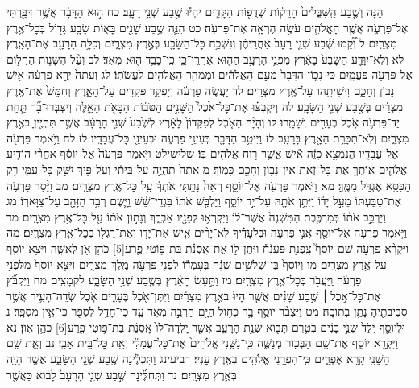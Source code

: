 \documentclass[twoside, openany, parskip=half, 11pt]{book}
\begin{document}
הֵ֔נָּה וְשֶׁ֤בַע הַֽשִּׁבֳּלִים֙ הָרֵק֔וֹת שְׁדֻפ֖וֹת הַקָּדִ֑ים יִהְי֕וּ שֶׁ֖בַע שְׁנֵ֥י רָעָֽב׃ כח ה֣וּא הַדָּבָ֔ר אֲשֶׁ֥ר דִּבַּ֖רְתִּי אֶל־פַּרְעֹ֑ה אֲשֶׁ֧ר הָאֱלֹהִ֛ים עֹשֶׂ֖ה הֶרְאָ֥ה אֶת־פַּרְעֹֽה׃ כט הִנֵּ֛ה שֶׁ֥בַע שָׁנִ֖ים בָּא֑וֹת שָׂבָ֥ע גָּד֖וֹל בְּכׇל־אֶ֥רֶץ מִצְרָֽיִם׃ ל וְ֠קָ֠מוּ שֶׁ֜בַע שְׁנֵ֤י רָעָב֙ אַחֲרֵיהֶ֔ן וְנִשְׁכַּ֥ח כׇּל־הַשָּׂבָ֖ע בְּאֶ֣רֶץ מִצְרָ֑יִם וְכִלָּ֥ה הָרָעָ֖ב אֶת־הָאָֽרֶץ׃ לא וְלֹֽא־יִוָּדַ֤ע הַשָּׂבָע֙ בָּאָ֔רֶץ מִפְּנֵ֛י הָרָעָ֥ב הַה֖וּא אַחֲרֵי־כֵ֑ן כִּֽי־כָבֵ֥ד ה֖וּא מְאֹֽד׃ לב וְעַ֨ל הִשָּׁנ֧וֹת הַחֲל֛וֹם אֶל־פַּרְעֹ֖ה פַּעֲמָ֑יִם כִּֽי־נָכ֤וֹן הַדָּבָר֙ מֵעִ֣ם הָאֱלֹהִ֔ים וּמְמַהֵ֥ר הָאֱלֹהִ֖ים לַעֲשֹׂתֽוֹ׃ לג וְעַתָּה֙ יֵרֶ֣א פַרְעֹ֔ה אִ֖ישׁ נָב֣וֹן וְחָכָ֑ם וִישִׁיתֵ֖הוּ עַל־אֶ֥רֶץ מִצְרָֽיִם׃ לד יַעֲשֶׂ֣ה פַרְעֹ֔ה וְיַפְקֵ֥ד פְּקִדִ֖ים עַל־הָאָ֑רֶץ וְחִמֵּשׁ֙ אֶת־אֶ֣רֶץ מִצְרַ֔יִם בְּשֶׁ֖בַע שְׁנֵ֥י הַשָּׂבָֽע׃ לה וְיִקְבְּצ֗וּ אֶת־כׇּל־אֹ֙כֶל֙ הַשָּׁנִ֣ים הַטֹּב֔וֹת הַבָּאֹ֖ת הָאֵ֑לֶּה וְיִצְבְּרוּ־בָ֞ר תַּ֧חַת יַד־פַּרְעֹ֛ה אֹ֥כֶל בֶּעָרִ֖ים וְשָׁמָֽרוּ׃ לו וְהָיָ֨ה הָאֹ֤כֶל לְפִקָּדוֹן֙ לָאָ֔רֶץ לְשֶׁ֙בַע֙ שְׁנֵ֣י הָרָעָ֔ב אֲשֶׁ֥ר תִּהְיֶ֖יןָ בְּאֶ֣רֶץ מִצְרָ֑יִם וְלֹֽא־תִכָּרֵ֥ת הָאָ֖רֶץ בָּרָעָֽב׃ לז וַיִּיטַ֥ב הַדָּבָ֖ר בְּעֵינֵ֣י פַרְעֹ֑ה וּבְעֵינֵ֖י כׇּל־עֲבָדָֽיו׃ לז לח וַיֹּ֥אמֶר פַּרְעֹ֖ה אֶל־עֲבָדָ֑יו הֲנִמְצָ֣א כָזֶ֔ה אִ֕ישׁ אֲשֶׁ֛ר ר֥וּחַ אֱלֹהִ֖ים בּֽוֹ׃ שלישילט וַיֹּ֤אמֶר פַּרְעֹה֙ אֶל־יוֹסֵ֔ף אַחֲרֵ֨י הוֹדִ֧יעַ אֱלֹהִ֛ים אוֹתְךָ֖ אֶת־כׇּל־זֹ֑את אֵין־נָב֥וֹן וְחָכָ֖ם כָּמֽוֹךָ׃ מ אַתָּה֙ תִּהְיֶ֣ה עַל־בֵּיתִ֔י וְעַל־פִּ֖יךָ יִשַּׁ֣ק כׇּל־עַמִּ֑י רַ֥ק הַכִּסֵּ֖א אֶגְדַּ֥ל מִמֶּֽךָּ׃ מא וַיֹּ֥אמֶר פַּרְעֹ֖ה אֶל־יוֹסֵ֑ף רְאֵה֙ נָתַ֣תִּי אֹֽתְךָ֔ עַ֖ל כׇּל־אֶ֥רֶץ מִצְרָֽיִם׃ מב וַיָּ֨סַר פַּרְעֹ֤ה אֶת־טַבַּעְתּוֹ֙ מֵעַ֣ל יָד֔וֹ וַיִּתֵּ֥ן אֹתָ֖הּ עַל־יַ֣ד יוֹסֵ֑ף וַיַּלְבֵּ֤שׁ אֹתוֹ֙ בִּגְדֵי־שֵׁ֔שׁ וַיָּ֛שֶׂם רְבִ֥ד הַזָּהָ֖ב עַל־צַוָּארֽוֹ׃ מג וַיַּרְכֵּ֣ב אֹת֗וֹ בְּמִרְכֶּ֤בֶת הַמִּשְׁנֶה֙ אֲשֶׁר־ל֔וֹ וַיִּקְרְא֥וּ לְפָנָ֖יו אַבְרֵ֑ךְ וְנָת֣וֹן אֹת֔וֹ עַ֖ל כׇּל־אֶ֥רֶץ מִצְרָֽיִם׃ מד וַיֹּ֧אמֶר פַּרְעֹ֛ה אֶל־יוֹסֵ֖ף אֲנִ֣י פַרְעֹ֑ה וּבִלְעָדֶ֗יךָ לֹֽא־יָרִ֨ים אִ֧ישׁ אֶת־יָד֛וֹ וְאֶת־רַגְל֖וֹ בְּכׇל־אֶ֥רֶץ מִצְרָֽיִם׃ מה וַיִּקְרָ֨א פַרְעֹ֣ה שֵׁם־יוֹסֵף֮ צָֽפְנַ֣ת פַּעְנֵ֒חַ֒ וַיִּתֶּן־ל֣וֹ אֶת־אָֽסְנַ֗ת בַּת־פּ֥וֹטִי פֶ֛רַע‏[5] כֹּהֵ֥ן אֹ֖ן לְאִשָּׁ֑ה וַיֵּצֵ֥א יוֹסֵ֖ף עַל־אֶ֥רֶץ מִצְרָֽיִם׃ מו וְיוֹסֵף֙ בֶּן־שְׁלֹשִׁ֣ים שָׁנָ֔ה בְּעׇמְד֕וֹ לִפְנֵ֖י פַּרְעֹ֣ה מֶֽלֶךְ־מִצְרָ֑יִם וַיֵּצֵ֤א יוֹסֵף֙ מִלִּפְנֵ֣י פַרְעֹ֔ה וַֽיַּעֲבֹ֖ר בְּכׇל־אֶ֥רֶץ מִצְרָֽיִם׃ מז וַתַּ֣עַשׂ הָאָ֔רֶץ בְּשֶׁ֖בַע שְׁנֵ֣י הַשָּׂבָ֑ע לִקְמָצִֽים׃ מח וַיִּקְבֹּ֞ץ אֶת־כׇּל־אֹ֣כֶל ׀ שֶׁ֣בַע שָׁנִ֗ים אֲשֶׁ֤ר הָיוּ֙ בְּאֶ֣רֶץ מִצְרַ֔יִם וַיִּתֶּן־אֹ֖כֶל בֶּעָרִ֑ים אֹ֧כֶל שְׂדֵה־הָעִ֛יר אֲשֶׁ֥ר סְבִיבֹתֶ֖יהָ נָתַ֥ן בְּתוֹכָֽהּ׃ מט וַיִּצְבֹּ֨ר יוֹסֵ֥ף בָּ֛ר כְּח֥וֹל הַיָּ֖ם הַרְבֵּ֣ה מְאֹ֑ד עַ֛ד כִּי־חָדַ֥ל לִסְפֹּ֖ר כִּי־אֵ֥ין מִסְפָּֽר׃ נ וּלְיוֹסֵ֤ף יֻלַּד֙ שְׁנֵ֣י בָנִ֔ים בְּטֶ֥רֶם תָּב֖וֹא שְׁנַ֣ת הָרָעָ֑ב אֲשֶׁ֤ר יָֽלְדָה־לּוֹ֙ אָֽסְנַ֔ת בַּת־פּ֥וֹטִי פֶ֖רַע‏[6] כֹּהֵ֥ן אֽוֹן׃ נא וַיִּקְרָ֥א יוֹסֵ֛ף אֶת־שֵׁ֥ם הַבְּכ֖וֹר מְנַשֶּׁ֑ה כִּֽי־נַשַּׁ֤נִי אֱלֹהִים֙ אֶת־כׇּל־עֲמָלִ֔י וְאֵ֖ת כׇּל־בֵּ֥ית אָבִֽי׃ נב וְאֵ֛ת שֵׁ֥ם הַשֵּׁנִ֖י קָרָ֣א אֶפְרָ֑יִם כִּֽי־הִפְרַ֥נִי אֱלֹהִ֖ים בְּאֶ֥רֶץ עׇנְיִֽי׃ רביעינג וַתִּכְלֶ֕ינָה שֶׁ֖בַע שְׁנֵ֣י הַשָּׂבָ֑ע אֲשֶׁ֥ר הָיָ֖ה בְּאֶ֥רֶץ מִצְרָֽיִם׃ נד וַתְּחִלֶּ֜ינָה שֶׁ֣בַע שְׁנֵ֤י הָרָעָב֙ לָב֔וֹא כַּאֲשֶׁ֖ר 
\end{document}
